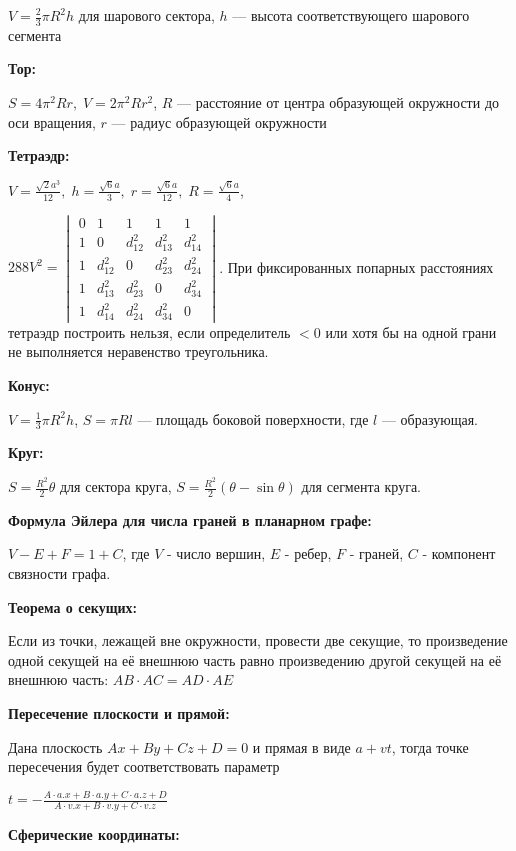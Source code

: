 $V=\frac{2}{3}\pi R^{2}h$ для шарового сектора, $h$ --- высота соответствующего шарового сегмента

\textbf{Тор:}

$S=4\pi^2Rr,\; V=2\pi^2Rr^2$, $R$ --- расстояние от центра образующей окружности до оси вращения, $r$ --- радиус образующей окружности

\textbf{Тетраэдр:}

$V=\frac{\sqrt 2 a^3}{12},\; h=\frac{\sqrt 6 a}{3},\; r=\frac{\sqrt 6 a}{12},\; R=\frac{\sqrt 6 a}{4}$,

$288V^2=
\begin{vmatrix}
0 & 1 & 1 & 1 & 1\\ 
1 & 0 & d_{12}^{2} & d_{13}^{2} & d_{14}^{2}\\ 
1 & d_{12}^{2} & 0 & d_{23}^{2} & d_{24}^{2}\\ 
1 & d_{13}^{2} & d_{23}^{2} & 0 & d_{34}^{2}\\ 
1 & d_{14}^{2} & d_{24}^{2} & d_{34}^{2} & 0
\end{vmatrix}$. При фиксированных попарных расстояниях тетраэдр построить нельзя, если определитель $<0$ или хотя бы на одной грани не выполняется неравенство треугольника.

\textbf{Конус:}

$V=\frac{1}{3}\pi R^2 h$,
$S=\pi Rl$ --- площадь боковой поверхности, где $l$ --- образующая.

\textbf{Круг:}

$S=\frac{R^2}{2}\theta$ для сектора круга,
$S=\frac{R^2}{2}(\theta - \sin\theta)$ для сегмента круга.

\textbf{Формула Эйлера для числа граней в планарном графе:}

$V-E+F=1+C$, где $V$ - число вершин, $E$ - ребер, $F$ - граней, $C$ - компонент связности графа.

\textbf{Теорема о секущих:}

Если из точки, лежащей вне окружности, провести две секущие, то произведение одной секущей на её внешнюю часть равно произведению другой секущей на её внешнюю часть:
$AB\cdot AC=AD\cdot AE$

\textbf{Пересечение плоскости и прямой:}

Дана плоскость $Ax+By+Cz+D=0$ и прямая в виде $a+vt$, тогда точке пересечения будет соответствовать параметр

$t=-\frac{A \cdot a.x+B \cdot a.y+C \cdot a.z+D}{A \cdot v.x+B \cdot v.y+C \cdot v.z}$

\textbf{Сферические координаты:}


